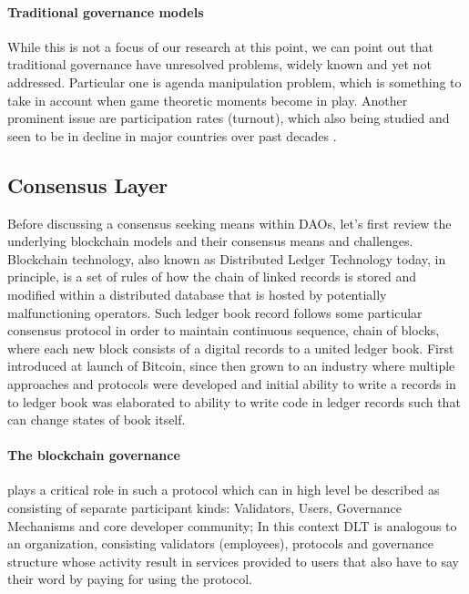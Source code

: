 \documentclass{article}
\begin{document}
\begin{CJK}{UTF8}{gbsn}
\begin{multicols}{2}
        \paragraph{Traditional governance models} While this is not a focus of our research at this point, we can point out that traditional governance have  unresolved problems, widely known and yet not addressed. Particular one is agenda manipulation problem, \cite{McKelvey1976} which is something to take in account when game theoretic moments become in play. Another prominent issue are participation rates (turnout), which also being studied and seen to be in decline in major countries over past decades \cite{Lawrence23}\cite{Filip24}.


        \subsection{Consensus Layer}
        Before discussing a consensus seeking means within DAOs, let's first review the underlying blockchain models and their consensus means and challenges. Blockchain technology, also known as Distributed Ledger Technology today, in principle, is a set of rules of how the chain of linked records is stored and modified within a distributed database that is hosted by potentially malfunctioning operators.
        Such ledger book record follows some particular consensus protocol in order to maintain continuous sequence, chain of blocks\cite{Merlinda2019}, where each new block consists of a digital records to a united ledger book. First introduced at launch of Bitcoin\cite{Satoshi}, since then grown to an industry where multiple approaches and protocols were developed and initial ability to write a records in to ledger book was elaborated to ability to write code in ledger records such that can change states of book itself.
        \paragraph{The blockchain governance} plays a critical role in such a protocol which can in high level be described as consisting of separate participant kinds: Validators, Users, Governance Mechanisms and core developer community; In this context DLT is analogous to an organization, consisting validators (employees), protocols and governance structure whose activity result in services provided to users that also have to say their word by paying for using the protocol.


\end{multicols}
\end{CJK}
\end{document}
